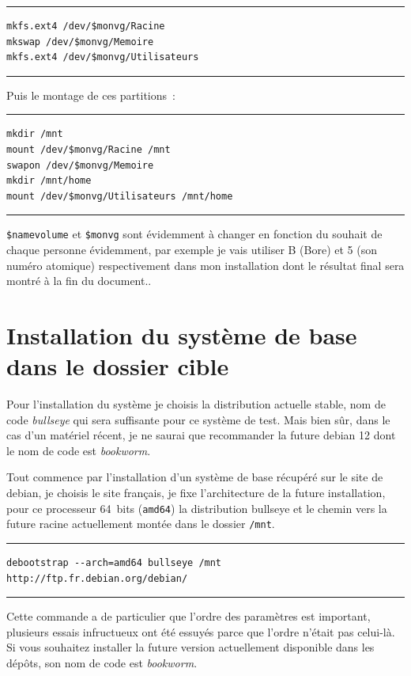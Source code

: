 \documentclass[12pt, a4paper]{report}
\begin{document}
\noindent \rule{\linewidth}{0.5pt}
\begin{verbatim}
mkfs.ext4 /dev/$monvg/Racine
mkswap /dev/$monvg/Memoire
mkfs.ext4 /dev/$monvg/Utilisateurs
\end{verbatim}
\rule{\linewidth}{0.5pt}

Puis le montage de ces partitions~:

\noindent \rule{\linewidth}{0.5pt}
\begin{verbatim}
mkdir /mnt
mount /dev/$monvg/Racine /mnt
swapon /dev/$monvg/Memoire
mkdir /mnt/home
mount /dev/$monvg/Utilisateurs /mnt/home
\end{verbatim}
\rule{\linewidth}{0.5pt}

\texttt{\$namevolume} et \texttt{\$monvg} sont évidemment à changer en fonction du souhait de chaque personne évidemment, par exemple je vais utiliser B (Bore) et 5 (son numéro atomique) respectivement dans mon installation dont le résultat final sera montré à la fin du document..

\section{Installation du système de base dans le dossier cible}
Pour l'installation du système je choisis la distribution actuelle stable, nom de code \emph{bullseye} qui sera suffisante pour ce système de test. Mais bien sûr, dans le cas d'un matériel récent, je ne saurai que recommander la future debian 12 dont le nom de code est \emph{bookworm}.

Tout commence par l'installation d'un système de base récupéré sur le site de debian, je choisis le site français, je fixe l'architecture de la future installation, pour ce processeur 64~bits (\texttt{amd64}) la distribution bullseye et le chemin vers la future racine actuellement montée dans le dossier \texttt{/mnt}.

\noindent \rule{\linewidth}{0.5pt}
\begin{verbatim}
debootstrap --arch=amd64 bullseye /mnt http://ftp.fr.debian.org/debian/
\end{verbatim}
\rule{\linewidth}{0.5pt}

Cette commande a de particulier que l'ordre des paramètres est important, plusieurs essais infructueux ont été essuyés parce que l'ordre n'était pas celui-là.
Si vous souhaitez installer la future version actuellement disponible dans les dépôts, son nom de code est \emph{bookworm\/}.
\end{document}

